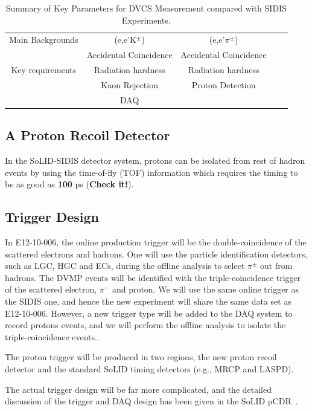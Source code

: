 \begin{table}
\begin{tabular}{|c|c|c|c|c|}
Main Backgrounds                  & (e,e'K$^\pm$)        &(e,e'$\pi^{\pm}$) \\
                                                &   Accidental Coincidence      & Accidental Coincidence	\\\hline
Key requirements                      &  Radiation hardness   & Radiation hardness	\\
                                             &  Kaon Rejection   & Proton Detection	\\
                                              &  DAQ                  &       \\
                        \hline
\end{tabular}
\caption{\footnotesize{Summary of Key Parameters for DVCS Measurement compared with SIDIS Experiments.}}\label{table:program_summary}
\label{table:key_par_sidis_dvcs}
\end{table} 

\subsection{A Proton Recoil Detector}
In the SoLID-SIDIS detector system, protons can be isolated from rest of hadron events by using the time-of-fly (TOF) information which requires the timing to be as good as {\bf 100} ps ({\bf Check it!}). 



\subsection{Trigger Design}
In E12-10-006, the online production trigger will be the double-coincidence of the scattered electrons and hadrons. One will use the particle identification detectors, such as LGC, HGC and ECs, during the offline analysis to select $\pi^{\pm}$ out from hadrons. The DVMP events will be identified with the triple-coincidence trigger of the scattered electron, $\pi^{-}$ and proton. We will use the same online trigger as the SIDIS one, and hence the new experiment will share the same data set as E12-10-006. However, a new trigger type will be added to the DAQ system to record protons events, and we will perform the offline analysis to isolate the triple-coincidence events.. 

The proton trigger will be produced in two regions, the new proton recoil detector and the standard SoLID timing detectors (e.g., MRCP and LASPD). 

The actual trigger design will be far more complicated, and the detailed discussion of the trigger and DAQ design has been given in the SoLID pCDR~\cite{solid_pcdr}.
